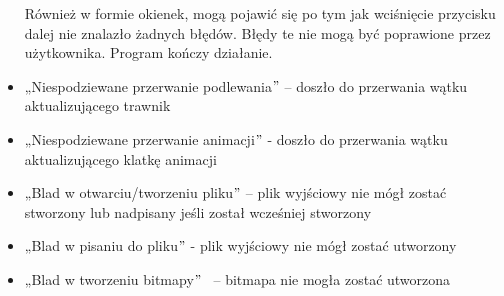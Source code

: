 \documentclass[12pt]{article}
\renewcommand{\_}{\kern-1.5pt\textunderscore\kern-1.5pt}
\begin{document}
\begin{itemize}
\setlength{\parskip}{3.0pt}
Również w formie okienek, mogą pojawić się po tym jak wciśnięcie przycisku dalej nie znalazło żadnych błędów. Błędy te nie mogą być poprawione przez użytkownika. Program kończy działanie.\par

\setlength{\parskip}{5.04pt}
	\item „Niespodziewane przerwanie podlewania$"$  – doszło do przerwania wątku aktualizującego trawnik\par

	\item „Niespodziewane przerwanie animacji$"$  - doszło do przerwania wątku aktualizującego klatkę animacji\par

	\item „Blad w otwarciu/tworzeniu pliku$"$  – plik wyjściowy nie mógł zostać stworzony lub nadpisany jeśli został wcześniej stworzony \par

	\item „Blad w pisaniu do pliku$"$  - plik wyjściowy nie mógł zostać utworzony\par

\setlength{\parskip}{8.04pt}
	\item „Blad w tworzeniu bitmapy$"$ \  – bitmapa nie mogła zostać utworzona
\end{itemize}\par


\printbibliography
\end{document}

